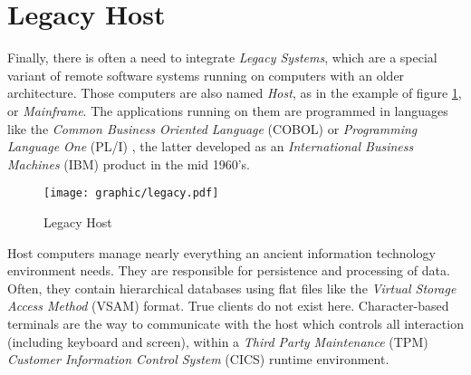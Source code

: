 %
%
%
%
%
%
%

\section{Legacy Host}
\label{legacy_host_heading}

Finally, there is often a need to integrate \emph{Legacy Systems}, which are a
special variant of remote software systems running on computers with an older
architecture. Those computers are also named \emph{Host}, as in the example of
figure \ref{legacy_figure}, or \emph{Mainframe}. The applications running on
them are programmed in languages like the \emph{Common Business Oriented Language}
(COBOL) or \emph{Programming Language One} (PL/I) \cite{pli}, the latter
developed as an \emph{International Business Machines} (IBM) \cite{ibm} product
in the mid 1960's.

\begin{figure}[ht]
    \begin{center}
        \texttt{[image: graphic/legacy.pdf]}
        \caption{Legacy Host}
        \label{legacy_figure}
    \end{center}
\end{figure}

Host computers manage nearly everything an ancient information technology
environment needs. They are responsible for persistence and processing of data.
Often, they contain hierarchical databases \cite{oolegacysystems} using flat
files like the \emph{Virtual Storage Access Method} (VSAM) format. True clients
do not exist here. Character-based terminals are the way to communicate with
the host which controls all interaction (including keyboard and screen), within
a \emph{Third Party Maintenance} (TPM) \emph{Customer Information Control System}
(CICS) runtime environment.
